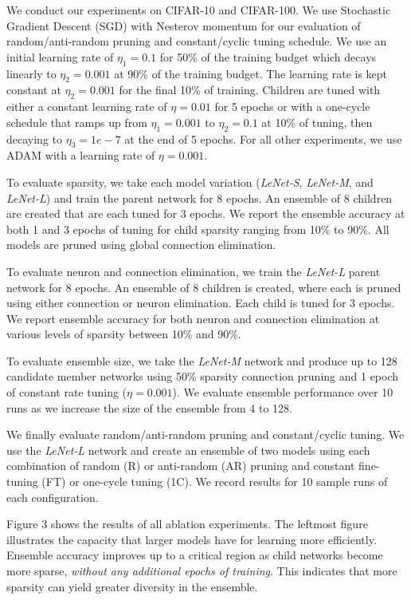 \documentclass[letterpaper]{article} %
\begin{document}
We conduct our experiments on CIFAR-10 and CIFAR-100. We use Stochastic Gradient Descent (SGD) with Nesterov momentum for our evaluation of random/anti-random pruning and constant/cyclic tuning schedule. We use an initial learning rate of $\eta_1 = 0.1$ for 50\% of the training budget which decays linearly to $\eta_2 = 0.001$ at 90\% of the training budget. The learning rate is kept constant at $\eta_2 = 0.001$ for the final 10\% of training. Children are tuned with either a constant learning rate of $\eta=0.01$ for 5 epochs or with a one-cycle schedule that ramps up from $\eta_1=0.001$ to $\eta_2=0.1$ at 10\% of tuning, then decaying to $\eta_3=1e-7$ at the end of 5 epochs. For all other experiments, we use ADAM with a learning rate of $\eta = 0.001$.

To evaluate sparsity, we take each model variation ({\it LeNet-S}, {\it LeNet-M}, and {\it LeNet-L}) and train the parent network for 8 epochs. An ensemble of 8 children are created that are each tuned for 3 epochs. We report the ensemble accuracy at both 1 and 3 epochs of tuning for child sparsity ranging from 10\% to 90\%. 
All models are pruned using global connection elimination. 

To evaluate neuron and connection elimination, we train the {\it LeNet-L} parent network for 8 epochs. An ensemble of 8 children is created, where each is pruned using either connection or neuron elimination. Each child is tuned for 3 epochs. We report ensemble accuracy for both neuron and connection elimination at various levels of sparsity between 10\% and 90\%.

To evaluate ensemble size, we take the {\it LeNet-M} network and produce up to 128 candidate member networks using 50\% sparsity connection pruning and 1 epoch of constant rate tuning ($\eta=0.001$). We evaluate ensemble performance over 10 runs as we increase the size of the ensemble from 4 to 128.

We finally evaluate random/anti-random pruning and constant/cyclic tuning. We use the {\it LeNet-L} network and create an ensemble of two models using each combination of random (R) or anti-random (AR) pruning and constant fine-tuning (FT) or one-cycle tuning (1C). We record results for 10 sample runs of each configuration.

Figure 3 shows the results of all ablation experiments. The leftmost figure illustrates the capacity that larger models have for learning more efficiently. Ensemble accuracy improves up to a critical region as child networks become more sparse, {\em without any additional epochs of training}. This indicates that more sparsity can yield greater diversity in the ensemble. 
\end{document}
